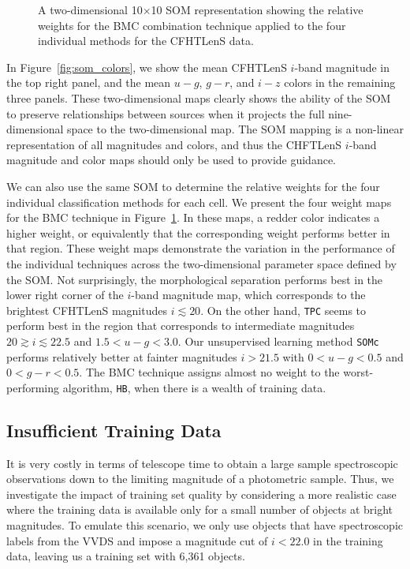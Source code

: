 \documentclass[useAMS,usenatbib]{mn2e}
\begin{document}
\begin{figure}
\begin{minipage}[b]{0.49\linewidth}
    \caption{A two-dimensional 10$\times$10 SOM representation
             showing the relative weights for the BMC combination technique
             applied to the four individual methods for the CFHTLenS data.}
    \label{fig:weights}
  \end{minipage}
\end{figure}

In Figure~\ref{fig:som_colors}, we show
the mean CFHTLenS $i$-band magnitude in the top right panel,
and the mean $u-g$, $g-r$, and $i-z$ colors in the remaining three panels.
These two-dimensional maps clearly shows
the ability of the SOM to preserve
relationships between sources
when it projects the full nine-dimensional space to
the two-dimensional map.
The SOM mapping is a non-linear representation of
all magnitudes and colors,
and thus the CHFTLenS $i$-band magnitude and color maps should 
only be used to provide guidance.

We can also use the same SOM to determine the relative weights for 
the four individual classification methods for each cell.
We present the four weight maps for the BMC technique
in Figure~\ref{fig:weights}.
In these maps, a redder color indicates a higher weight,
or equivalently that the corresponding weight performs better in that region.
These weight maps demonstrate the variation in
the performance of the individual techniques across
the two-dimensional parameter space defined by the SOM.
Not surprisingly, the morphological separation
performs best in the lower right corner of the $i$-band magnitude map,
which corresponds to the brightest CFHTLenS magnitudes $i \lesssim 20$.
On the other hand, \texttt{TPC} seems to perform best
in the region that corresponds to intermediate magnitudes
$20\gtrsim i \lesssim22.5$ and $1.5<u-g<3.0$.
Our unsupervised learning method \texttt{SOMc}
performs relatively better at fainter magnitudes $i>21.5$
with $0<u-g<0.5$ and $0<g-r<0.5$.
The BMC technique assigns almost no weight to
the worst-performing algorithm, \texttt{HB},
when there is a wealth of training data.

\subsection{Insufficient Training Data}
  \label{section:poor_training}
  
It is very costly in terms of telescope time to
obtain a large sample spectroscopic observations
down to the limiting magnitude of a photometric sample.
Thus, we investigate the impact of training set quality
by considering a more realistic case
where the training data is available
only for a small number of objects at bright magnitudes.
To emulate this scenario,
we only use objects that have spectroscopic labels from the VVDS
and impose a magnitude cut of $i < 22.0$ in the training data,
leaving us a training set with 6,361 objects.
\end{document}
